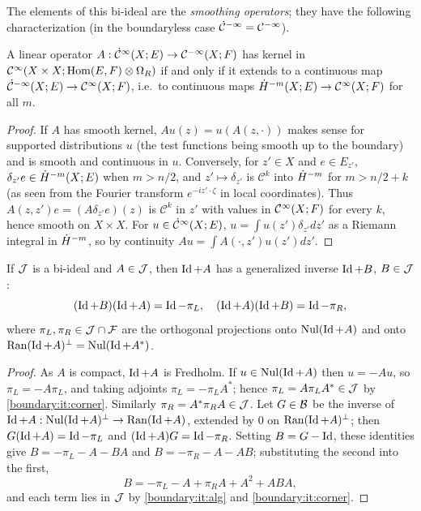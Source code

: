 The elements of this bi-ideal are the \emph{smoothing operators}; they have the
following characterization (in the boundaryless case $\dot{\mathcal{C}}^{-\infty}=\mathcal{C}^{-\infty}$).

\begin{proposition}\label{boundary:prop:smoothing-char}
A linear operator $A:\dot{\mathcal{C}}^\infty(X;E)\to\mathcal{C}^{-\infty}(X;F)$ has kernel in $\mathcal{C}^\infty(X\times X;\operatorname{Hom}(E,F)
\otimes\Omega_R)$ if and only if it extends to a continuous map $\dot{\mathcal{C}}^{-\infty}(X;E)\to
\mathcal{C}^\infty(X;F)$, i.e.\ to continuous maps $\dot{H}^{-m}(X;E)\to\mathcal{C}^\infty(X;F)$ for all $m$.
\end{proposition}
\begin{proof}
If $A$ has smooth kernel, $Au(z)=u(A(z,\cdot))$ makes sense for supported
distributions $u$ (the test functions being smooth up to the boundary) and is smooth
and continuous in $u$. Conversely, for $z'\in X$ and $e\in E_{z'}$, $\delta_{z'}e\in
\dot{H}^{-m}(X;E)$ when $m>n/2$, and $z'\mapsto\delta_{z'}$ is $\mathcal{C}^k$ into
$\dot{H}^{-m}$ for $m>n/2+k$ (as seen from the Fourier transform $e^{-iz'\cdot\zeta}$ in
local coordinates). Thus $A(z,z')e=(A\delta_{z'}e)(z)$ is $\mathcal{C}^k$ in $z'$
with values in $\mathcal{C}^\infty(X;F)$ for every $k$, hence smooth on $X\times X$. For
$u\in\dot{\mathcal{C}}^\infty(X;E)$, $u=\int u(z')\delta_{z'}dz'$ as a Riemann integral in $\dot{H}^{-m}$,
so by continuity $Au=\int A(\cdot,z')u(z')dz'$.
\end{proof}

\begin{proposition}\label{boundary:prop:gen-inverse}
If $\mathcal{J}$ is a bi-ideal and $A\in\mathcal{J}$, then $\operatorname{Id}+A$ has a generalized inverse $\operatorname{Id}+B$,
$B\in\mathcal{J}$:
\begin{equation*}
(\operatorname{Id}+B)(\operatorname{Id}+A)=\operatorname{Id}-\pi_L,\quad(\operatorname{Id}+A)(\operatorname{Id}+B)=\operatorname{Id}-\pi_R,
\end{equation*}
where $\pi_L,\pi_R\in\mathcal{J}\cap\mathcal{F}$ are the orthogonal projections onto $\operatorname{Nul}(\operatorname{Id}+A)$ and
onto $\operatorname{Ran}(\operatorname{Id}+A)^\perp=\operatorname{Nul}(\operatorname{Id}+A^*)$.
\end{proposition}
\begin{proof}
As $A$ is compact, $\operatorname{Id}+A$ is Fredholm. If $u\in\operatorname{Nul}(\operatorname{Id}+A)$ then $u=-Au$, so
$\pi_L=-A\pi_L$, and taking adjoints $\pi_L=-\pi_LA^*$; hence $\pi_L=A\pi_LA^*\in\mathcal{J}$
by \ref{boundary:it:corner}. Similarly $\pi_R=A^*\pi_RA\in\mathcal{J}$. Let $G\in\mathcal{B}$ be
the inverse of $\operatorname{Id}+A:\operatorname{Nul}(\operatorname{Id}+A)^\perp\to\operatorname{Ran}(\operatorname{Id}+A)$, extended by $0$ on
$\operatorname{Ran}(\operatorname{Id}+A)^\perp$; then $G(\operatorname{Id}+A)=\operatorname{Id}-\pi_L$ and $(\operatorname{Id}+A)G=\operatorname{Id}-\pi_R$. Setting
$B=G-\operatorname{Id}$, these identities give $B=-\pi_L-A-BA$ and $B=-\pi_R-A-AB$; substituting
the second into the first,
\begin{equation*}
B=-\pi_L-A+\pi_RA+A^2+ABA,
\end{equation*}
and each term lies in $\mathcal{J}$ by \ref{boundary:it:alg} and \ref{boundary:it:corner}.
\end{proof}

